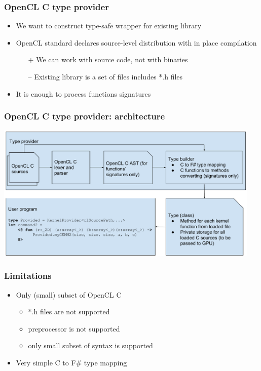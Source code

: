 \documentclass[xcolor=table]{beamer}
\begin{document}
\begin{frame}
  \transwipe[direction=90]
  \frametitle{OpenCL C type provider}
\begin{itemize}
\item We want to construct type-safe wrapper for existing library
\item OpenCL standard declares source-level distribution with in place compilation
\begin{itemize}
\item[+] We can work with source code, not with binaries
\item[--] Existing library is a set of files includes *.h files
\end{itemize}
\item It is enough to process functions signatures
\end{itemize}
\end{frame}
 
\begin{frame}
  \transwipe[direction=90]
  \frametitle{OpenCL C type provider: architecture}
    
  \includegraphics[width=0.95\textwidth]{pictures/OpenCL_C_TP.pdf}
  \\
  \pause
\end{frame}

\begin{frame}
  \transwipe[direction=90]
  \frametitle{Limitations}
\begin{itemize}
\item Only (small) subset of OpenCL C
 \begin{itemize}
 \item *.h files are not supported
 \item preprocessor is not supported
 \item only small subset of syntax is supported
  \end{itemize}
\item Very simple C to F\# type mapping
\end{itemize}

\end{frame}
\end{document}
